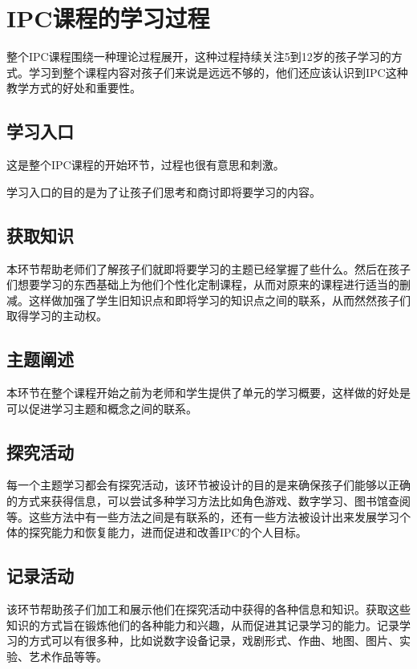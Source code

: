 \section{IPC课程的学习过程}
     整个IPC课程围绕一种理论过程展开，这种过程持续关注5到12岁的孩子学习的方式。学习到整个课程内容对孩子们来说是远远不够的，他们还应该认识到IPC这种教学方式的好处和重要性。 \par
     

\subsection{学习入口}
    这是整个IPC课程的开始环节，过程也很有意思和刺激。 \par
    学习入口的目的是为了让孩子们思考和商讨即将要学习的内容。

\subsection{获取知识}
    本环节帮助老师们了解孩子们就即将要学习的主题已经掌握了些什么。然后在孩子们想要学习的东西基础上为他们个性化定制课程，从而对原来的课程进行适当的删减。这样做加强了学生旧知识点和即将学习的知识点之间的联系，从而然然孩子们取得学习的主动权。\par

\subsection{主题阐述}
    本环节在整个课程开始之前为老师和学生提供了单元的学习概要，这样做的好处是可以促进学习主题和概念之间的联系。\par

\subsection{探究活动}
    每一个主题学习都会有探究活动，该环节被设计的目的是来确保孩子们能够以正确的方式来获得信息，可以尝试多种学习方法比如角色游戏、数字学习、图书馆查阅等。这些方法中有一些方法之间是有联系的，还有一些方法被设计出来发展学习个体的探究能力和恢复能力，进而促进和改善IPC的个人目标。

\subsection{记录活动}
    该环节帮助孩子们加工和展示他们在探究活动中获得的各种信息和知识。获取这些知识的方式旨在锻炼他们的各种能力和兴趣，从而促进其记录学习的能力。记录学习的方式可以有很多种，比如说数字设备记录，戏剧形式、作曲、地图、图片、实验、艺术作品等等。

